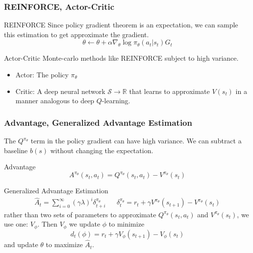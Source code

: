 \documentclass{beamer}
\begin{document}
\begin{frame}
  \frametitle{REINFORCE, Actor-Critic}
  \begin{block}{REINFORCE}
    Since policy gradient theorem is an expectation, we can sample this estimation to get approximate the gradient.
    \begin{equation*}
    \theta \gets \theta + \alpha \nabla_\theta \log \pi_\theta (a_t \vert s_t) G_t
    \end{equation*}
  \end{block}
  \begin{block}{Actor-Critic}
    Monte-carlo methods like REINFORCE subject to high variance.
    \begin{itemize}
      \item Actor: The policy $\pi_\theta$
      \item Critic: A deep neural network $\mathcal{S} \to \mathbb{R}$ that learns to approximate $V(s_t)$ in a manner analogous to deep $Q$-learning.
    \end{itemize}
  \end{block}
\end{frame}

\begin{frame}
  \frametitle{Advantage, Generalized Advantage Estimation}
  The $Q^{\pi_\theta}$ term in the policy gradient can have high variance. We can subtract a baseline $b(s)$ without changing the expectation.
  \begin{block}{Advantage}
    \begin{equation*}
      A^{\pi_\theta}(s_t, a_t) = Q^{\pi_\theta}(s_t, a_t) - V^{\pi_\theta}(s_t)
    \end{equation*}
  \end{block}
  \begin{exampleblock}{Generalized Advantage Estimation}
    \begin{align*}
        \hat{A}_t = \sum_{i=0}^\infty (\gamma \lambda)^i \delta_{t+i}^{\pi_\theta}
        & &
        \delta_t^{\pi_\theta} = r_t + \gamma V^{\pi_\theta} (s_{t+1}) - V^{\pi_\theta}(s_t)
    \end{align*}
    rather than two sets of parameters to approximate $Q^{\pi_\theta}(s_t, a_t)$ and $V^{\pi_\theta}(s_t)$, we use one: $V_\phi$. Then $V_\phi$ we update $\phi$ to minimize $$d_t(\phi) = r_t + \gamma V_\phi(s_{t+1}) - V_\phi(s_t)$$ and update $\theta$ to maximize $\hat{A}_t$.
  \end{exampleblock}
\end{frame}
\end{document}

